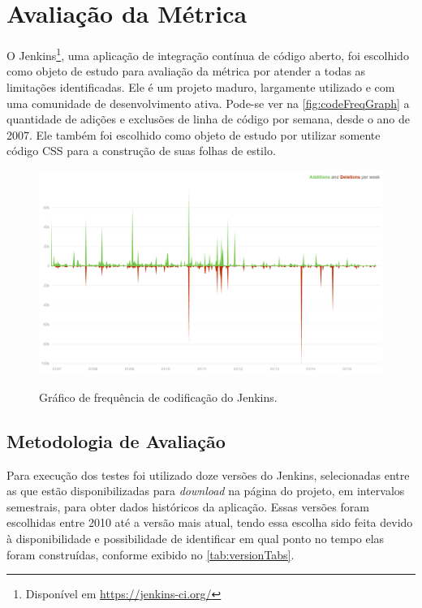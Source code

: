 \chapter{Avaliação da Métrica}

O Jenkins\footnote{Disponível em \url{https://jenkins-ci.org/}}, uma aplicação de integração contínua de código aberto, foi escolhido como objeto de estudo para avaliação da métrica por atender a todas as limitações identificadas. Ele é um projeto maduro, largamente utilizado e com uma comunidade de desenvolvimento ativa. Pode-se ver na \autoref{fig:codeFreqGraph} a quantidade de adições e exclusões de linha de código por semana, desde o ano de 2007. Ele também foi escolhido como objeto de estudo por utilizar somente código CSS para a construção de suas folhas de estilo.

\begin{figure}[!htb]
	\centering
	\caption{Gráfico de frequência de codificação do Jenkins.}
	\includegraphics[width=1\textwidth]{./04-figuras/code_freq_graph}
	\label{fig:codeFreqGraph}
\end{figure}

\section{Metodologia de Avaliação}

Para execução dos testes foi utilizado doze versões do Jenkins, selecionadas entre as que estão disponibilizadas para \textit{download} na página do projeto, em intervalos semestrais, para obter dados históricos da aplicação. Essas versões foram escolhidas entre 2010 até a versão mais atual, tendo essa escolha sido feita devido à disponibilidade e possibilidade de identificar em qual ponto no tempo elas foram construídas, conforme exibido no \autoref{tab:versionTabs}.

